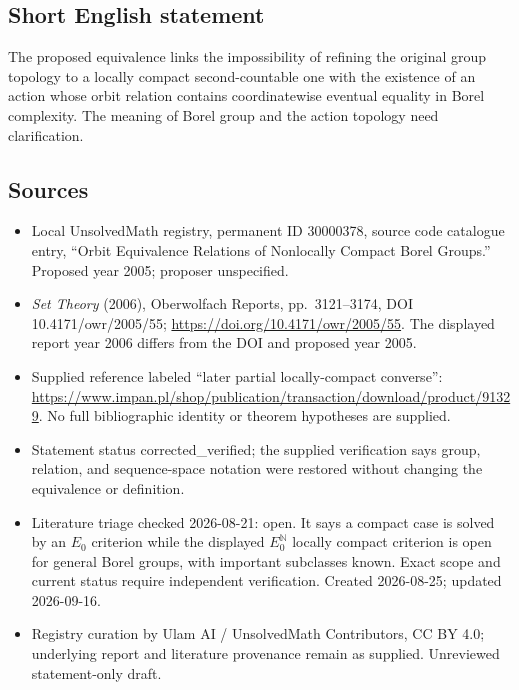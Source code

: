 \documentclass[11pt]{article}
\newcommand{\N}{\mathbb{N}}
\begin{document}
\subsection{Short English statement}
The proposed equivalence links the impossibility of refining the original group topology to a locally compact second-countable one with the existence of an action whose orbit relation contains coordinatewise eventual equality in Borel complexity. The meaning of Borel group and the action topology need clarification.
\subsection{Sources}
\begin{itemize}
\item Local UnsolvedMath registry, permanent ID 30000378, source code catalogue entry, ``Orbit Equivalence Relations of Nonlocally Compact Borel Groups.'' Proposed year 2005; proposer unspecified.
\item \emph{Set Theory} (2006), Oberwolfach Reports, pp.\ 3121--3174, DOI 10.4171/owr/2005/55; \url{https://doi.org/10.4171/owr/2005/55}. The displayed report year 2006 differs from the DOI and proposed year 2005.
\item Supplied reference labeled ``later partial locally-compact converse'': \url{https://www.impan.pl/shop/publication/transaction/download/product/91329}. No full bibliographic identity or theorem hypotheses are supplied.
\item Statement status corrected\_verified; the supplied verification says group, relation, and sequence-space notation were restored without changing the equivalence or definition.
\item Literature triage checked 2026-08-21: open. It says a compact case is solved by an $E_0$ criterion while the displayed $E_0^{\N}$ locally compact criterion is open for general Borel groups, with important subclasses known. Exact scope and current status require independent verification. Created 2026-08-25; updated 2026-09-16.
\item Registry curation by Ulam AI / UnsolvedMath Contributors, CC BY 4.0; underlying report and literature provenance remain as supplied. Unreviewed statement-only draft.
\end{itemize}
\end{document}
